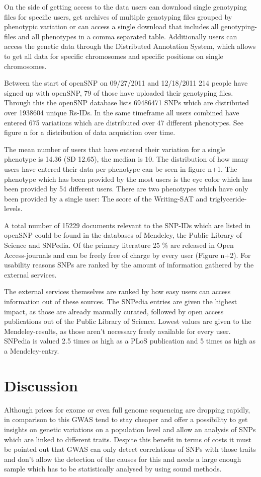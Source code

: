 \documentclass[10pt]{article}
\begin{document}
On the side of getting access to the data users can download single genotyping files for specific users, get archives of multiple genotyping files grouped by phenotypic variation or can access a single download that includes all genotyping-files and all phenotypes in a comma separated table. Additionally users can access the genetic data through the Distributed Annotation System, which allows to get all data for specific chromosomes and specific positions on single chromosomes.

Between the start of openSNP on 09/27/2011 and 12/18/2011 214 people have signed up with openSNP, 79 of those have uploaded their genotyping files. Through this the openSNP database lists 69486471 SNPs which are distributed over 1938604 unique Rs-IDs. In the same timeframe all users combined have entered 675 variations which are distributed over 47 different phenotypes. See figure n for a distribution of data acquisition over time. 

The mean number of users that have entered their variation for a single phenotype is 14.36 (SD 12.65), the median is 10. The distribution of how many users have entered their data per phenotype can be seen in figure n+1. The phenotype which has been provided by the most users is the eye color which has been provided by 54 different users. There are two phenotypes which have only been provided by a single user: The score of the Writing-SAT and triglyceride-levels. 

A total number of 15229 documents relevant to the SNP-IDs which are listed in openSNP could be found in the databases of Mendeley, the Public Library of Science and SNPedia. Of the primary literature 25 \% are released in Open Access-journals and can be freely free of charge by every user (Figure n+2). For usability reasons SNPs are ranked by the amount of information gathered by the external services. 

The external services themselves are ranked by how easy users can access information out of these sources. The SNPedia entries are given the highest impact, as those are already manually curated, followed by open access publications out of the Public Library of Science. Lowest values are given to the Mendeley-results, as those aren't necessary freely available for every user. SNPedia is valued 2.5 times as high as a PLoS publication and 5 times as high as a Mendeley-entry.  

\section*{Discussion}
Although prices for exome or even full genome sequencing are dropping rapidly, in comparison to this GWAS tend to stay cheaper and offer a possibility to get insights on genetic variations on a population level and allow an analysis of SNPs which are linked to different traits. Despite this benefit in terms of costs it must be pointed out that GWAS can only detect correlations of SNPs with those traits and don't allow the detection of the causes for this and needs a large enough sample which has to be statistically analysed by using sound methods. 
\end{document}

